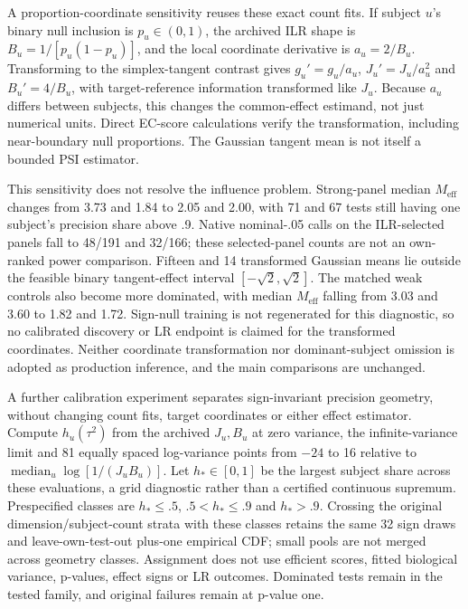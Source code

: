 \documentclass[11pt]{article}
\begin{document}
A proportion-coordinate sensitivity reuses these exact count fits. If subject \(u\)'s binary null inclusion is \(p_u\in(0,1)\), the archived ILR shape is \(B_u=1/[p_u(1-p_u)]\), and the local coordinate derivative is \(a_u=2/B_u\). Transforming to the simplex-tangent contrast gives \(g_u'=g_u/a_u\), \(J_u'=J_u/a_u^2\) and \(B_u'=4/B_u\), with target-reference information transformed like \(J_u\). Because \(a_u\) differs between subjects, this changes the common-effect estimand, not just numerical units. Direct EC-score calculations verify the transformation, including near-boundary null proportions. The Gaussian tangent mean is not itself a bounded PSI estimator.

This sensitivity does not resolve the influence problem. Strong-panel median \(M_{\mathrm{eff}}\) changes from 3.73 and 1.84 to 2.05 and 2.00, with 71 and 67 tests still having one subject's precision share above .9. Native nominal-.05 calls on the ILR-selected panels fall to 48/191 and 32/166; these selected-panel counts are not an own-ranked power comparison. Fifteen and 14 transformed Gaussian means lie outside the feasible binary tangent-effect interval \([-\sqrt2,\sqrt2]\). The matched weak controls also become more dominated, with median \(M_{\mathrm{eff}}\) falling from 3.03 and 3.60 to 1.82 and 1.72. Sign-null training is not regenerated for this diagnostic, so no calibrated discovery or LR endpoint is claimed for the transformed coordinates. Neither coordinate transformation nor dominant-subject omission is adopted as production inference, and the main comparisons are unchanged.

A further calibration experiment separates sign-invariant precision geometry, without changing count fits, target coordinates or either effect estimator. Compute \(h_u(\tau^2)\) from the archived \(J_u,B_u\) at zero variance, the infinite-variance limit and 81 equally spaced log-variance points from \(-24\) to 16 relative to \(\operatorname{median}_u\log[1/(J_uB_u)]\). Let \(h_*\in[0,1]\) be the largest subject share across these evaluations, a grid diagnostic rather than a certified continuous supremum. Prespecified classes are \(h_*\le.5\), \(.5<h_*\le.9\) and \(h_*>.9\). Crossing the original dimension/subject-count strata with these classes retains the same 32 sign draws and leave-own-test-out plus-one empirical CDF; small pools are not merged across geometry classes. Assignment does not use efficient scores, fitted biological variance, p-values, effect signs or LR outcomes. Dominated tests remain in the tested family, and original failures remain at p-value one.
\end{document}
